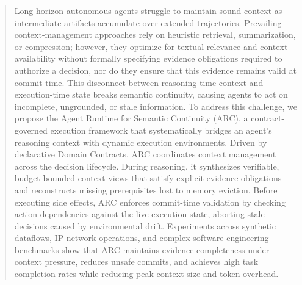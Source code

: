 \begin{abstract}
Long-horizon autonomous agents struggle to maintain sound context as intermediate artifacts accumulate over extended trajectories.
Prevailing context-management approaches rely on heuristic retrieval, summarization, or compression; however, they optimize for
textual relevance and context availability without formally specifying evidence obligations required to authorize a decision,
nor do they ensure that this evidence remains valid at commit time.
This disconnect between reasoning-time context and execution-time state breaks semantic continuity, causing
agents to act on incomplete, ungrounded, or stale information.
To address this challenge, we propose the Agent Runtime for Semantic Continuity (ARC),
a contract-governed execution framework that systematically bridges an agent’s reasoning context with dynamic execution environments.
Driven by declarative Domain Contracts, ARC coordinates context management across the decision lifecycle.
During reasoning, it synthesizes verifiable, budget-bounded context views that satisfy explicit evidence obligations and
reconstructs missing prerequisites lost to memory eviction. Before executing side effects,
ARC enforces commit-time validation by checking action dependencies against the live execution state,
aborting stale decisions caused by environmental drift.
Experiments across synthetic dataflows, IP network operations, and complex software engineering benchmarks
show that ARC maintains evidence completeness under context pressure, reduces unsafe commits,
and achieves high task completion rates while reducing peak context size and token overhead.
\end{abstract}
\newcommand{\method}{\textsc{ARC}}
\newcommand{\methodCRI}{\textsc{ARC-CRI}}
\newcommand{\Eligible}{\operatorname{Eligible}}
\newcommand{\Dep}{\operatorname{Dep}}
\newcommand{\Complete}{\operatorname{Complete}}
\newcommand{\Cost}{\operatorname{Cost}}
\newcommand{\Valid}{\operatorname{Valid}}
\newcommand{\Sat}{\operatorname{Sat}}
\newcommand{\Authorize}{\operatorname{Authorize}}

